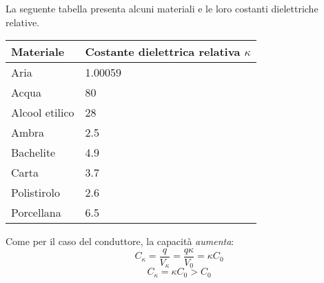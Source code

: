 La seguente tabella presenta alcuni materiali e le loro costanti dielettriche relative.
\begin{center}
	\begin{tabular}{ll}
		\textbf{Materiale}      & \textbf{Costante dielettrica relativa} $\kappa$\\\hline
		Aria           & \num{1,00059}                                                                    \\
		Acqua          & \num{80}                                                                         \\
		Alcool etilico & \num{28}                                                                         \\
		Ambra          & \num{2,5}                                                                        \\
		Bachelite      & \num{4,9}                                                                        \\
		Carta          & \num{3,7}                                                                        \\
		Polistirolo    & \num{2,6}                                                                        \\
		Porcellana     & \num{6,5}                                                                       
	\end{tabular}
\end{center}
Come per il caso del conduttore, la capacità \textit{aumenta}:
\begin{equation*}
	C_{\kappa}=\frac{q}{V_{\kappa}}=\frac{q\kappa}{V_0}=\kappa C_0
\end{equation*}
\begin{equation}
	C_{\kappa}=\kappa C_0>C_0
\end{equation}

